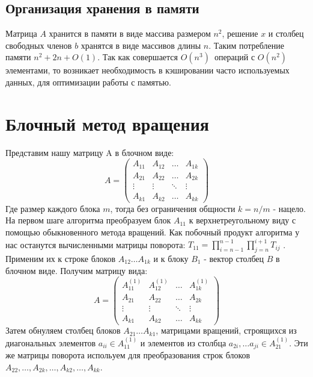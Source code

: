 \documentclass[a4paper, fontsize=14pt]{article}
\begin{document}
 		\subsection{Организация хранения в памяти}
 		Матрица $A$ хранится в памяти в виде массива размером $n^2$, решение $x$ и столбец свободных членов $b$ хранятся в виде массивов длины $n$. Таким потребление памяти $n^2 + 2n + O(1)$. Так как совершается $O(n^3)\,$ операций с $O(n^2)$ элементами, то возникает необходимость в кэшировании часто используемых данных, для оптимизации работы с памятью.
 		 
	\newpage
	\section{Блочный метод вращения}
		Представим нашу матрицу A в блочном виде:
		\begin{equation*}
			A = \left(
			\begin{array}{cccc}
				A_{11} & A_{12} & \ldots & A_{1k}\\
				A_{21} & A_{22} & \ldots & A_{2k}\\
				\vdots & \vdots & \ddots & \vdots\\
				A_{k1} & A_{k2} & \ldots & A_{kk}
			\end{array}
			\right)
		\end{equation*}
	Где размер каждого блока $m$, тогда без ограничения общности $k = n / m$ - нацело.
		\\На первом шаге алгоритма преобразуем блок $A_{11}$ к верхнетреугольному виду с помощью обыкновенного метода вращений. Как побочный продукт алгоритма у нас останутся вычисленными матрицы поворота: $T_{11} = \prod_{i = n-1}^{n-1}\prod_{j=n}^{i+1}T_{ij}$ . Применим их к строке блоков $A_{12}\dots A_{1k}$ и к блоку $B_{1}$ - вектор столбец $B$ в блочном виде. Получим матрицу вида:
				\begin{equation*}
			A = \left(
			\begin{array}{cccc}
				A_{11}^{(1)} & A_{12}^{(1)} & \ldots & A_{1k}^{(1)}\\
				A_{21} & A_{22} & \ldots & A_{2k}\\
				\vdots & \vdots & \ddots & \vdots\\
				A_{k1} & A_{k2} & \ldots & A_{kk}
			\end{array}
			\right)
		\end{equation*}
		Затем обнуляем столбец блоков $A_{21}\dots A_{k1}$, матрицами вращений, строящихся из диагональных элементов $a_{ii} \in  A_{11}^{(1)}$ и элементов из столбца $a_{2i}, \dots a_{ji} \in A_{21}^{(1)}$. Эти же матрицы поворота испольуем для преобразования строк блоков $A_{22},\dots , A_{2k}, \dots  ,A_{k2}, \dots , A_{kk}$.
\end{document}
